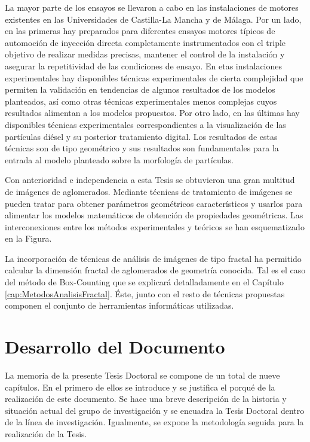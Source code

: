 \par La mayor parte de los ensayos se llevaron a cabo en las instalaciones de motores existentes en las Universidades de Castilla-La Mancha y de Málaga. Por un lado, en las primeras hay preparados para diferentes ensayos motores típicos de automoción de inyección directa completamente instrumentados con el triple objetivo de realizar medidas precisas, mantener el control de la instalación y asegurar la repetitividad de las condiciones de ensayo. En etas instalaciones experimentales hay disponibles técnicas experimentales de cierta complejidad que permiten la validación en tendencias de algunos resultados de los modelos planteados, así como otras técnicas experimentales menos complejas cuyos resultados alimentan a los modelos propuestos. Por otro lado, en las últimas hay disponibles técnicas experimentales correspondientes a la visualización de las partículas diésel y su posterior tratamiento digital. Los resultados de estas técnicas son de tipo geométrico y sus resultados son fundamentales para la entrada al modelo planteado sobre la morfología de partículas.

\par Con anterioridad e independencia a esta Tesis se obtuvieron una gran multitud de imágenes de aglomerados. Mediante técnicas de tratamiento de imágenes se pueden tratar para obtener parámetros geométricos característicos y usarlos para alimentar los modelos matemáticos de obtención de propiedades geométricas. Las interconexiones entre los métodos experimentales y teóricos se han esquematizado en la Figura.

\par La incorporación de técnicas de análisis de imágenes de tipo fractal ha permitido calcular la dimensión fractal de aglomerados de geometría conocida. Tal es el caso del método de Box-Counting que se explicará detalladamente en el Capítulo \ref{cap:MetodosAnalisisFractal}. Éste, junto con el resto de técnicas propuestas componen el conjunto de herramientas informáticas utilizadas.

\section{Desarrollo del Documento}\label{sec:DesarrolloDocumento}

\par La memoria de la presente Tesis Doctoral se compone de un total de nueve capítulos. En el primero de ellos se introduce y se justifica el porqué de la realización de este documento. Se hace una breve descripción de la historia y situación actual del grupo de investigación y se encuadra la Tesis Doctoral dentro de la línea de investigación. Igualmente, se expone la metodología seguida para la realización de la Tesis.

